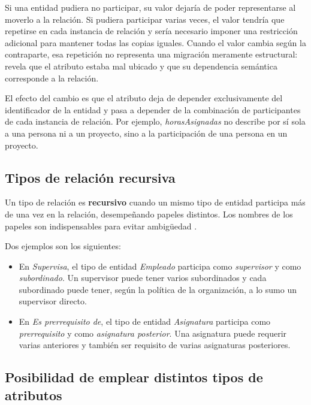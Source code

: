 Si una entidad pudiera no participar, su valor dejaría de poder representarse
al moverlo a la relación. Si pudiera participar varias veces, el valor tendría
que repetirse en cada instancia de relación y sería necesario imponer una
restricción adicional para mantener todas las copias iguales. Cuando el valor
cambia según la contraparte, esa repetición no representa una migración
meramente estructural: revela que el atributo estaba mal ubicado y que su
dependencia semántica corresponde a la relación.

El efecto del cambio es que el atributo deja de depender exclusivamente del
identificador de la entidad y pasa a depender de la combinación de
participantes de cada instancia de relación. Por ejemplo, \emph{horasAsignadas}
no describe por sí sola a una persona ni a un proyecto, sino a la participación
de una persona en un proyecto.

\clearpage
\subsection{Tipos de relación recursiva}

Un tipo de relación es \textbf{recursivo} cuando un mismo tipo de entidad
participa más de una vez en la relación, desempeñando papeles distintos. Los
nombres de los papeles son indispensables para evitar ambigüedad
\cite{silberschatz2019database}.

Dos ejemplos son los siguientes:

\begin{itemize}
  \item En \emph{Supervisa}, el tipo de entidad \emph{Empleado} participa como
        \emph{supervisor} y como \emph{subordinado}. Un supervisor puede tener
        varios subordinados y cada subordinado puede tener, según la política
        de la organización, a lo sumo un supervisor directo.
  \item En \emph{Es prerrequisito de}, el tipo de entidad \emph{Asignatura}
        participa como \emph{prerrequisito} y como \emph{asignatura posterior}.
        Una asignatura puede requerir varias anteriores y también ser requisito
        de varias asignaturas posteriores.
\end{itemize}

\subsection{Posibilidad de emplear distintos tipos de atributos}

